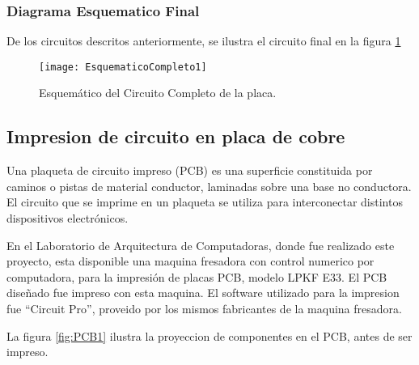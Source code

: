 

\subsubsection{Diagrama Esquematico Final}
\label{it3:ssub:diagrama_esquematico_final}

De los circuitos descritos anteriormente, se ilustra el circuito final en la figura \ref{fig:EsquematicoCompleto1}

\begin{figure}[H]
\centering
  \texttt{[image: EsquematicoCompleto1]}
  \caption{Esquemático del Circuito Completo de la placa.}\label{fig:EsquematicoCompleto1}
\end{figure}



\subsection{Impresion de circuito en placa de cobre}
\label{it3:sub:impresion_de_circuito_en_placa_de_cobre}

Una plaqueta de circuito impreso (PCB) es una superficie constituida por caminos o pistas de material conductor, laminadas sobre una base no conductora. El circuito que se imprime en un plaqueta se utiliza para interconectar distintos dispositivos electrónicos.

En el Laboratorio de Arquitectura de Computadoras, donde fue realizado este proyecto, esta disponible una maquina fresadora con control numerico por computadora, para la impresión de placas PCB, modelo LPKF E33. El PCB diseñado fue impreso con esta maquina. El software utilizado para la impresion fue ``Circuit Pro'', proveido por los mismos fabricantes de la maquina fresadora. 

La figura \ref{fig:PCB1} ilustra la proyeccion de componentes en el PCB, antes de ser impreso.

